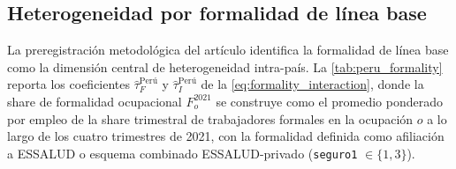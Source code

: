 \subsection{Heterogeneidad por formalidad de l\'{i}nea base}
\label{subsec:results_formality}

La preregistraci\'{o}n metodol\'{o}gica del art\'{i}culo identifica la formalidad de l\'{i}nea base como la dimensi\'{o}n central de heterogeneidad intra-pa\'{i}s. La \cref{tab:peru_formality} reporta los coeficientes $\hat\tau_F^{\text{Per\'{u}}}$ y $\hat\tau_I^{\text{Per\'{u}}}$ de la \cref{eq:formality_interaction}, donde la share de formalidad ocupacional $F_o^{2021}$ se construye como el promedio ponderado por empleo de la share trimestral de trabajadores formales en la ocupaci\'{o}n $o$ a lo largo de los cuatro trimestres de 2021, con la formalidad definida como afiliaci\'{o}n a ESSALUD o esquema combinado ESSALUD-privado (\texttt{seguro1} $\in \{1, 3\}$).

